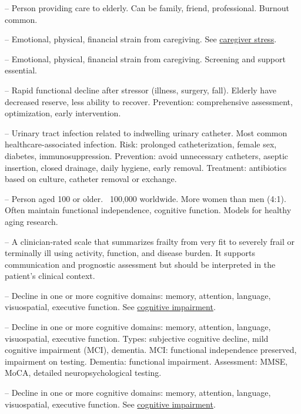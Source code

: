 -- Person providing care to elderly. Can be family, friend, professional. Burnout common.

-- Emotional, physical, financial strain from caregiving. See \hyperlink{Caregiver Stress}{caregiver stress}.

-- Emotional, physical, financial strain from caregiving. Screening and support essential.

-- Rapid functional decline after stressor (illness, surgery, fall). Elderly have decreased reserve, less ability to recover. Prevention: comprehensive assessment, optimization, early intervention.

-- Urinary tract infection related to indwelling urinary catheter. Most common healthcare-associated infection. Risk: prolonged catheterization, female sex, diabetes, immunosuppression. Prevention: avoid unnecessary catheters, aseptic insertion, closed drainage, daily hygiene, early removal. Treatment: antibiotics based on culture, catheter removal or exchange.

-- Person aged 100 or older. ~100,000 worldwide. More women than men (4:1). Often maintain functional independence, cognitive function. Models for healthy aging research.

-- A clinician-rated scale that summarizes frailty from very fit to severely frail or terminally ill using activity, function, and disease burden. It supports communication and prognostic assessment but should be interpreted in the patient's clinical context.

-- Decline in one or more cognitive domains: memory, attention, language, visuospatial, executive function. See \hyperlink{Cognitive Impairment}{cognitive impairment}.


-- Decline in one or more cognitive domains: memory, attention, language, visuospatial, executive function. Types: subjective cognitive decline, mild cognitive impairment (MCI), dementia. MCI: functional independence preserved, impairment on testing. Dementia: functional impairment. Assessment: MMSE, MoCA, detailed neuropsychological testing.

-- Decline in one or more cognitive domains: memory, attention, language, visuospatial, executive function. See \hyperlink{Cognitive Impairment}{cognitive impairment}.

